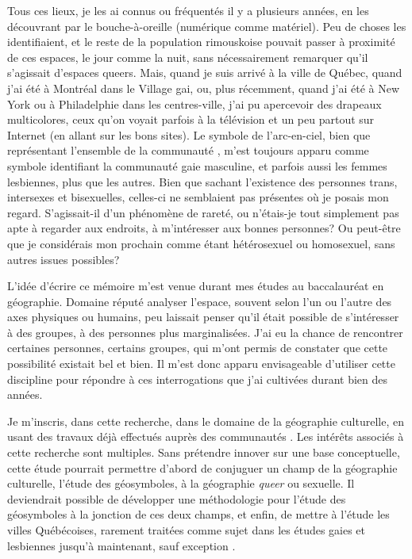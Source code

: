 Tous ces lieux, je les ai connus ou fréquentés il y a plusieurs années, en les découvrant par le bouche-à-oreille (numérique comme matériel).
Peu de choses les identifiaient, et le reste de la population rimouskoise pouvait passer à proximité de ces espaces, le jour comme la nuit, sans nécessairement remarquer qu'il s'agissait d'espaces queers.
Mais, quand je suis arrivé à la ville de Québec, quand j'ai été à Montréal dans le Village gai, ou, plus récemment, quand j'ai été à New York ou à Philadelphie dans les centres-ville, j'ai pu apercevoir des drapeaux multicolores, ceux qu'on voyait parfois à la télévision et un peu partout sur Internet (en allant sur les bons sites).
Le symbole de l'arc-en-ciel, bien que représentant l'ensemble de la communauté \lgbt{}, m'est toujours apparu comme symbole identifiant la communauté gaie masculine, et parfois aussi les femmes lesbiennes, plus que les autres.
Bien que sachant l'existence des personnes trans, intersexes et bisexuelles, celles-ci ne semblaient pas présentes où je posais mon regard.
S'agissait-il d'un phénomène de rareté, ou n’étais-je tout simplement pas apte à regarder aux endroits, à m'intéresser aux bonnes personnes?
Ou peut-être que je considérais mon prochain comme étant hétérosexuel ou homosexuel, sans autres issues possibles?

L'idée d'écrire ce mémoire m'est venue durant mes études au baccalauréat en géographie.
Domaine réputé analyser l'espace, souvent selon l'un ou l'autre des axes physiques ou humains, peu laissait penser qu'il était possible de s'intéresser à des groupes, à des personnes plus marginalisées.
J'ai eu la chance de rencontrer certaines personnes, certains groupes, qui m'ont permis de constater que cette possibilité existait bel et bien.
Il m'est donc apparu envisageable d'utiliser cette discipline pour répondre à ces interrogations que j'ai cultivées durant bien des années.

Je m'inscris, dans cette recherche, dans le domaine de la géographie culturelle, en usant des travaux déjà effectués auprès des communautés \lgbt{}.
Les intérêts associés à cette recherche sont multiples.
Sans prétendre innover sur une base conceptuelle, cette étude pourrait permettre d'abord de conjuguer un champ de la géographie culturelle, l'étude des géosymboles, à la géographie \emph{queer} ou sexuelle.
Il deviendrait possible de développer une méthodologie pour l'étude des géosymboles à la jonction de ces deux champs, et enfin, de mettre à l'étude les villes Québécoises, rarement traitées comme sujet dans les études gaies et lesbiennes jusqu'à maintenant, sauf exception \parencite{Chamberland1993,Podmore2006,Podmore2001,Hebert2012,Hunt2008,Laprade2014}.

